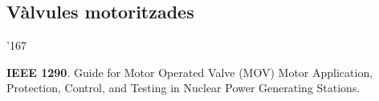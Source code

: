 \subsection*{V\`{a}lvules motoritzades}
\begin{dinglist}{'167}
    \item \textbf{IEEE 1290}. Guide for Motor Operated Valve (MOV) Motor Application, Protection, Control, and Testing in Nuclear Power Generating Stations.
\end{dinglist}


